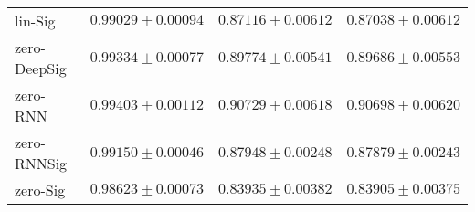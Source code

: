 \begin{tabular}{llll}
lin-Sig        &                           $ 0.99029 \pm 0.00094 $ &                           $ 0.87116 \pm 0.00612 $ &                           $ 0.87038 \pm 0.00612 $ \\
zero-DeepSig   &                           $ 0.99334 \pm 0.00077 $ &                           $ 0.89774 \pm 0.00541 $ &                           $ 0.89686 \pm 0.00553 $ \\
zero-RNN       &                           $ 0.99403 \pm 0.00112 $ &                           $ 0.90729 \pm 0.00618 $ &                           $ 0.90698 \pm 0.00620 $ \\
zero-RNNSig    &                           $ 0.99150 \pm 0.00046 $ &                           $ 0.87948 \pm 0.00248 $ &                           $ 0.87879 \pm 0.00243 $ \\
zero-Sig       &                           $ 0.98623 \pm 0.00073 $ &                           $ 0.83935 \pm 0.00382 $ &                           $ 0.83905 \pm 0.00375 $ \\
\bottomrule
\end{tabular}
